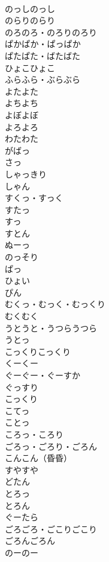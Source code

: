 \documentclass[8pt]{extreport}
\begin{document}
\begin{CJK}{UTF8}{min}
\\	のっしのっし	
\\	のらりのらり	
\\	のろのろ・のろりのろり	
\\	ぱかぱか・ぱっぱか	
\\	ぱたぱた・ばたばた	
\\	ひょこひょこ	
\\	ふらふら・ぶらぶら	
\\	よたよた	
\\	よちよち	
\\	よぼよぼ	
\\	よろよろ	
\\	わたわた	
\\	がばっ	
\\	さっ	
\\	しゃっきり	
\\	しゃん	
\\	すくっ・すっく	
\\	すたっ	
\\	すっ	
\\	すとん	
\\	ぬーっ	
\\	のっそり	
\\	ぱっ	
\\	ひょい	
\\	ぴん	
\\	むくっ・むっく・むっくり	
\\	むくむく	
\\	うとうと・うつらうつら	
\\	うとっ	
\\	こっくりこっくり	
\\	くーくー	
\\	ぐーぐー・ぐーすか	
\\	ぐっすり	
\\	こっくり	
\\	こてっ	
\\	ことっ	
\\	ころっ・ころり	
\\	ごろっ・ごろり・ごろん	
\\	こんこん（昏昏）	
\\	すやすや	
\\	どたん	
\\	とろっ	
\\	とろん	
\\	ぐーたら	
\\	ごろごろ・ごこりごこり	
\\	ごろんごろん	
\\	のーのー	

\end{CJK}
\end{document}

